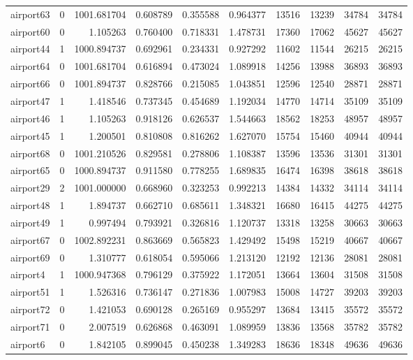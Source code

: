\begin{longtable}{|l|r|r|r|r|r|r|r|r|r|}
airport63 & 0 & 1001.681704 & 0.608789 & 0.355588 & 0.964377 & 13516 & 13239 & 34784 & 34784 \\
airport60 & 0 & 1.105263 & 0.760400 & 0.718331 & 1.478731 & 17360 & 17062 & 45627 & 45627 \\
airport44 & 1 & 1000.894737 & 0.692961 & 0.234331 & 0.927292 & 11602 & 11544 & 26215 & 26215 \\
airport64 & 0 & 1001.681704 & 0.616894 & 0.473024 & 1.089918 & 14256 & 13988 & 36893 & 36893 \\
airport66 & 0 & 1001.894737 & 0.828766 & 0.215085 & 1.043851 & 12596 & 12540 & 28871 & 28871 \\
airport47 & 1 & 1.418546 & 0.737345 & 0.454689 & 1.192034 & 14770 & 14714 & 35109 & 35109 \\
airport46 & 1 & 1.105263 & 0.918126 & 0.626537 & 1.544663 & 18562 & 18253 & 48957 & 48957 \\
airport45 & 1 & 1.200501 & 0.810808 & 0.816262 & 1.627070 & 15754 & 15460 & 40944 & 40944 \\
airport68 & 0 & 1001.210526 & 0.829581 & 0.278806 & 1.108387 & 13596 & 13536 & 31301 & 31301 \\
airport65 & 0 & 1000.894737 & 0.911580 & 0.778255 & 1.689835 & 16474 & 16398 & 38618 & 38618 \\
airport29 & 2 & 1001.000000 & 0.668960 & 0.323253 & 0.992213 & 14384 & 14332 & 34114 & 34114 \\
airport48 & 1 & 1.894737 & 0.662710 & 0.685611 & 1.348321 & 16680 & 16415 & 44275 & 44275 \\
airport49 & 1 & 0.997494 & 0.793921 & 0.326816 & 1.120737 & 13318 & 13258 & 30663 & 30663 \\
airport67 & 0 & 1002.892231 & 0.863669 & 0.565823 & 1.429492 & 15498 & 15219 & 40667 & 40667 \\
airport69 & 0 & 1.310777 & 0.618054 & 0.595066 & 1.213120 & 12192 & 12136 & 28081 & 28081 \\
airport4 & 1 & 1000.947368 & 0.796129 & 0.375922 & 1.172051 & 13664 & 13604 & 31508 & 31508 \\
airport51 & 1 & 1.526316 & 0.736147 & 0.271836 & 1.007983 & 15008 & 14727 & 39203 & 39203 \\
airport72 & 0 & 1.421053 & 0.690128 & 0.265169 & 0.955297 & 13684 & 13415 & 35572 & 35572 \\
airport71 & 0 & 2.007519 & 0.626868 & 0.463091 & 1.089959 & 13836 & 13568 & 35782 & 35782 \\
airport6 & 0 & 1.842105 & 0.899045 & 0.450238 & 1.349283 & 18636 & 18348 & 49636 & 49636 \\

\end{longtable}
